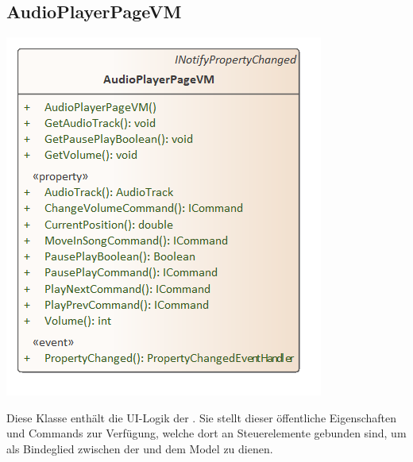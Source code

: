 \documentclass[../entwurf.tex]{subfiles}
\begin{document}
\subsection{AudioPlayerPageVM}
\begin{minipage}{0.5\textwidth}
\includegraphics[scale=0.75]{../graphics/vm_klassen/AudioPlayerPageVM.png}
\end{minipage}
\begin{minipage}{0.5\textwidth}
 \newline
Diese Klasse enthält die UI-Logik der . Sie stellt dieser öffentliche Eigenschaften und Commands zur Verfügung, welche dort an Steuerelemente gebunden sind, um als Bindeglied zwischen der  und dem Model zu dienen.
\end{minipage}
\end{document}
